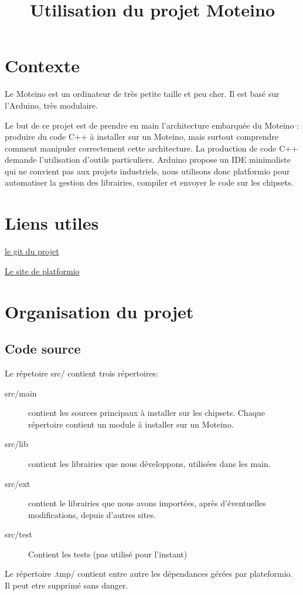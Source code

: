 \documentclass{report}
\title{Utilisation du projet Moteino}
\begin{document}
\chapter{Contexte}

Le Moteino est un ordinateur de très petite taille et peu cher. Il est basé sur l'Arduino, très modulaire. 

Le but de ce projet est de prendre en main l'architecture embarquée du Moteino : produire du code C++ à installer sur un Moteino, mais surtout comprendre comment manipuler correctement cette architecture.
La production de code C++ demande l'utilisation d'outils particuliers. Arduino propose un IDE minimaliste qui ne convient pas aux projets industriels, nous utilisons donc platformio pour automatiser la gestion des librairies, compiler et envoyer le code sur les chipsets.

\chapter{Liens utiles}

\href{https://github.com/glelouet/Moteino}{le git du projet}

\href{http://platformio.org/}{Le site de platformio}

\chapter{Organisation du projet}

\section{Code source}

Le répetoire src/ contient trois répertoires:
\begin{description}
\item[src/main] contient les sources principaux à installer sur les chipsets. Chaque répertoire contient un module à installer sur un Moteino.
\item[src/lib] contient les librairies que nous développons, utilisées dans les main.
\item[src/ext] contient le librairies que nous avons importées, après d'éventuelles modifications, depuis d'autres sites.
\item[src/test] Contient les tests (pas utilisé pour l'instant)
\end{description}

Le répertoire .tmp/ contient entre autre les dépendances gérées par plateformio. Il peut etre supprimé sans danger.
\end{document}
